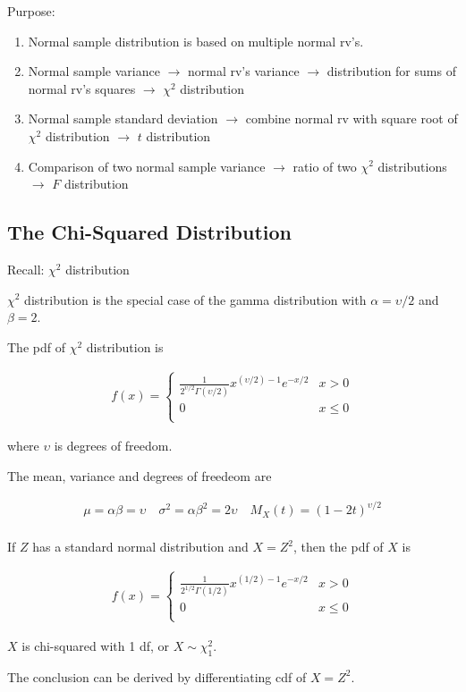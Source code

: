 Purpose: 

\begin{enumerate}
    \item Normal sample distribution is based on multiple normal rv's.
    \item Normal sample variance $\rightarrow$ normal rv's variance $\rightarrow$ distribution for sums of normal rv's squares $\rightarrow$ $\chi^2$ distribution
    \item Normal sample standard deviation $\rightarrow$ combine normal rv with square root of $\chi^2$ distribution $\rightarrow$ $t$ distribution
    \item Comparison of two normal sample variance $\rightarrow$ ratio of two $\chi^2$ distributions $\rightarrow$ $F$ distribution
\end{enumerate}

\subsection{The Chi-Squared Distribution}

Recall: $\chi^2$ distribution 

$\chi^2$ distribution is the special case of the gamma distribution with $\alpha=\upsilon/2$ and $\beta = 2$. 

The pdf of $\chi^2$ distribution is 

\begin{align*}
    f(x) = \left\{\begin{array}{cl}
        \frac{1}{2^{\upsilon/2}\Gamma(\upsilon/2)} x^{(\upsilon/2)-1} e^{-x/2} & x>0 \\
        0 & x\leq 0 \\
    \end{array}\right.
\end{align*}

where $\upsilon$ is degrees of freedom. 

The mean, variance and degrees of freedeom are 

\begin{align*}
    \mu = \alpha\beta = \upsilon \quad \sigma^2 = \alpha\beta^2 = 2\upsilon \quad M_X(t) = (1-2t)^{\upsilon/2} \\
\end{align*}

\begin{proposition}
    If $Z$ has a standard normal distribution and $X=Z^2$, then the pdf of $X$ is 

    \begin{align*}
        f(x) = \left\{\begin{array}{cl}
            \frac{1}{2^{1/2}\Gamma(1/2)} x^{(1/2)-1} e^{-x/2} & x > 0 \\
            0 & x\leq 0 \\
        \end{array}\right.
    \end{align*}

    $X$ is chi-squared with 1 df, or $X\sim \chi_1^2$.

    The conclusion can be derived by differentiating cdf of $X=Z^2$.
\end{proposition}

